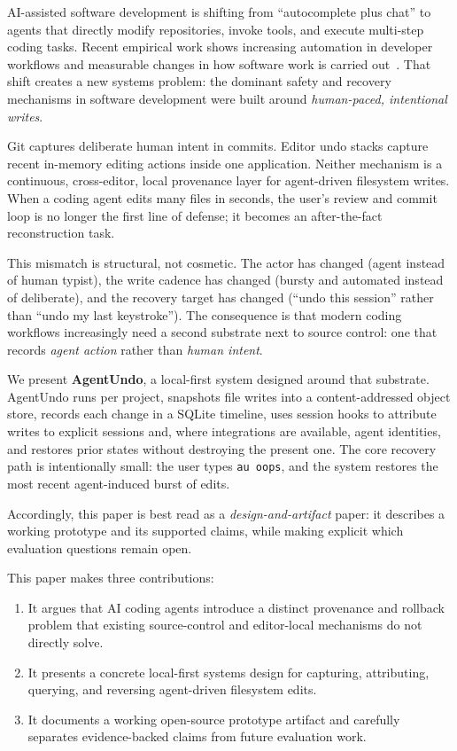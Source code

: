 \documentclass[10pt,a4paper]{article}
\begin{document}
AI-assisted software development is shifting from ``autocomplete plus chat'' to
agents that directly modify repositories, invoke tools, and execute
multi-step coding tasks. Recent empirical work shows increasing automation in
developer workflows and measurable changes in how software work is carried
out~\cite{chen2025codewithme,agarwal2026aiides}. That shift creates a new
systems problem: the dominant safety and recovery mechanisms in software
development were built around \emph{human-paced, intentional writes}.

Git captures deliberate human intent in commits. Editor undo stacks capture
recent in-memory editing actions inside one application. Neither mechanism is a
continuous, cross-editor, local provenance layer for agent-driven filesystem
writes. When a coding agent edits many files in seconds, the user's review and
commit loop is no longer the first line of defense; it becomes an after-the-fact
reconstruction task.

This mismatch is structural, not cosmetic. The actor has changed
(agent instead of human typist), the write cadence has changed (bursty and
automated instead of deliberate), and the recovery target has changed (``undo
this session'' rather than ``undo my last keystroke''). The consequence is that
modern coding workflows increasingly need a second substrate next to source
control: one that records \emph{agent action} rather than \emph{human intent}.

We present \textbf{AgentUndo}, a local-first system designed around that
substrate. AgentUndo runs per project, snapshots file writes into a
content-addressed object store, records each change in a SQLite timeline, uses
session hooks to attribute writes to explicit sessions and, where integrations
are available, agent identities, and restores prior states
without destroying the present one. The core recovery path is intentionally
small: the user types \texttt{au oops}, and the system restores the most recent
agent-induced burst of edits.

Accordingly, this paper is best read as a \emph{design-and-artifact} paper: it
describes a working prototype and its supported claims, while making explicit
which evaluation questions remain open.

This paper makes three contributions:

\begin{enumerate}
  \item It argues that AI coding agents introduce a distinct provenance and rollback problem that existing source-control and editor-local mechanisms do not directly solve.
  \item It presents a concrete local-first systems design for capturing, attributing, querying, and reversing agent-driven filesystem edits.
  \item It documents a working open-source prototype artifact and carefully separates evidence-backed claims from future evaluation work.
\end{enumerate}
\end{document}
